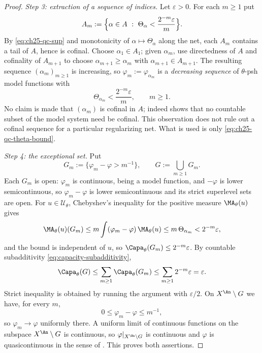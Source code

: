 \begin{proof}
\emph{Step 3: extraction of a sequence of indices.}  Let $\varepsilon>0$.
For each $m\geq1$ put
\[
 A_m:=\Bigl\{\alpha\in A\ :\
   \Theta_\alpha<\frac{2^{-m}\varepsilon}{m}\Bigr\}.
\]
By \eqref{eq:ch25-qc-sup} and monotonicity of $\alpha\mapsto\Theta_\alpha$
along the net, each $A_m$ contains a tail of $A$, hence is cofinal.
Choose $\alpha_1\in A_1$; given $\alpha_{m}$, use directedness of $A$
and cofinality of $A_{m+1}$ to choose
$\alpha_{m+1}\geq\alpha_m$ with $\alpha_{m+1}\in A_{m+1}$.  The resulting
sequence $(\alpha_m)_{m\geq1}$ is increasing, so
$\varphi_m:=\varphi_{\alpha_m}$ is a \emph{decreasing sequence} of
$\theta$-psh model functions with
\begin{equation}
\label{eq:ch25-qc-theta-bound}
 \Theta_{\alpha_m}<\frac{2^{-m}\varepsilon}{m},\qquad m\geq1 .
\end{equation}
No claim is made that $(\alpha_m)$ is cofinal in $A$; indeed
 shows that no countable subset of the
model system need be cofinal.  This observation does not rule out a
cofinal sequence for a particular regularizing net.  What is used is only
\eqref{eq:ch25-qc-theta-bound}.

\emph{Step 4: the exceptional set.}  Put
\[
 G_m:=\bigl\{\varphi_m-\varphi>m^{-1}\bigr\},
 \qquad
 G:=\bigcup_{m\geq1}G_m .
\]
Each $G_m$ is open: $\varphi_m$ is continuous, being a model function,
and $-\varphi$ is lower semicontinuous, so $\varphi_m-\varphi$ is lower
semicontinuous and its strict superlevel sets are open.  For
$u\in\mathcal U_\theta$, Chebyshev's inequality for the positive measure
$\MA_\theta(u)$ gives
\[
 \MA_\theta(u)(G_m)
 \leq m\int(\varphi_m-\varphi)\,\MA_\theta(u)
 \leq m\,\Theta_{\alpha_m}<2^{-m}\varepsilon ,
\]
and the bound is independent of $u$, so
$\Capa_\theta(G_m)\leq2^{-m}\varepsilon$.  By countable subadditivity
\eqref{eq:capacity-subadditivity},
\[
 \Capa_\theta(G)\leq\sum_{m\geq1}\Capa_\theta(G_m)
 \leq\sum_{m\geq1}2^{-m}\varepsilon=\varepsilon .
\]
Strict inequality is obtained by running the argument with
$\varepsilon/2$.  On $X^{\An}\setminus G$ we have, for every $m$,
\[
        0\leq\varphi_m-\varphi\leq m^{-1},
\]
so $\varphi_m\to\varphi$ uniformly there.  A uniform limit of continuous
functions on the subspace $X^{\An}\setminus G$ is continuous, so
$\varphi|_{X^{\An}\setminus G}$ is continuous and $\varphi$ is
quasicontinuous in the sense of
.  This proves both assertions.
\end{proof}

